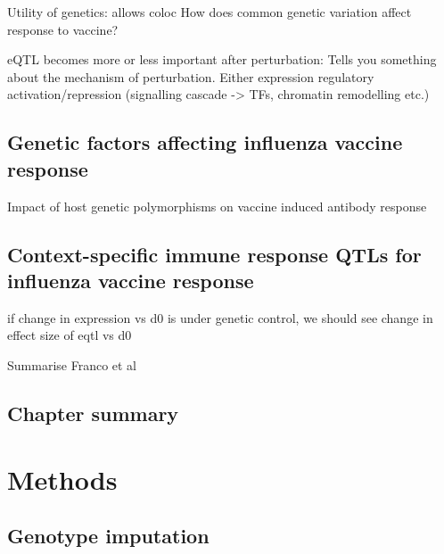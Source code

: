 Utility of genetics:
allows coloc
How does common genetic variation affect response to vaccine?

eQTL becomes more or less important after perturbation: Tells you something about the mechanism of perturbation.
Either expression regulatory activation/repression (signalling cascade -> TFs, chromatin remodelling etc.)

\subsection{Genetic factors affecting influenza vaccine response}


Impact of host genetic polymorphisms on vaccine induced antibody response


\subsection{Context-specific immune response QTLs for influenza vaccine response}

if change in expression vs d0 is under genetic control, we should see change in effect size of eqtl vs d0

Summarise Franco et al

\subsection{Chapter summary}

\section{Methods}

\subsection{Genotype imputation}

